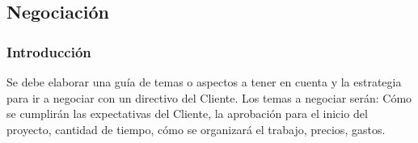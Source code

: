 \newpage

\subsection{Negociación}

\subsubsection{Introducción}

Se debe elaborar una guía de temas o aspectos a tener en cuenta y la estrategia para ir a negociar con un directivo del Cliente. Los temas a negociar serán: Cómo se cumplirán las expectativas del Cliente, la aprobación para el inicio del proyecto, cantidad de tiempo, cómo se organizará el trabajo, precios, gastos. 


